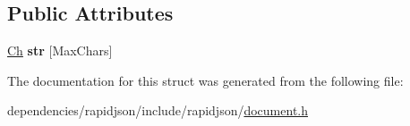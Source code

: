 \subsection*{Public Attributes}
\begin{DoxyCompactItemize}
\item 
\mbox{\label{struct_generic_value_1_1_short_string_a444e24523d4cc33830d18a2cfcfd333b}} 
\hyperlink{class_generic_value_ade0e0ce64ccd5d852da57a35e720bafb}{Ch} {\bfseries str} \mbox{[}Max\+Chars\mbox{]}
\end{DoxyCompactItemize}


The documentation for this struct was generated from the following file\+:\begin{DoxyCompactItemize}
\item 
dependencies/rapidjson/include/rapidjson/\hyperlink{document_8h}{document.\+h}\end{DoxyCompactItemize}

